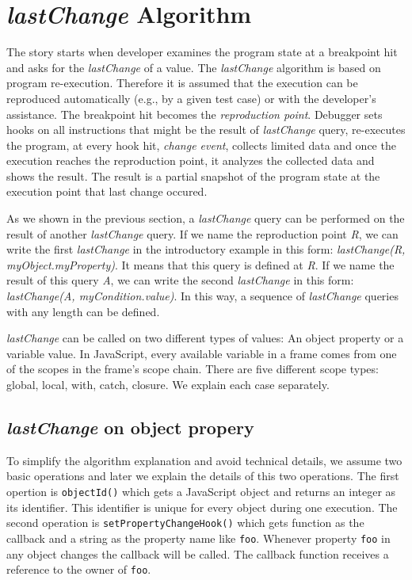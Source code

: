\documentclass[preprint]{sigplanconf}
\begin{document}
\section{\textit{lastChange} Algorithm}

The story starts when developer examines the program state at a breakpoint hit and asks for the \textit{lastChange} of a value. The \textit{lastChange} algorithm is based on program re-execution. Therefore it is assumed that the execution can be reproduced automatically (e.g., by a given test case) or with the developer's assistance. The breakpoint hit becomes the \textit{reproduction point}. Debugger sets hooks on all instructions that might be the result of \textit{lastChange} query, re-executes the program, at every hook hit, \textit{change event}, collects limited data and once the execution reaches the reproduction point, it analyzes the collected data and shows the result. The result is a partial snapshot of the program state at the execution point that last change occured. 

As we shown in the previous section, a \textit{lastChange} query can be performed on the result of another \textit{lastChange} query. If we name the reproduction point \textit{R}, we can write the first \textit{lastChange} in the introductory example in this form: \textit{lastChange(R, myObject.myProperty)}. It means that this query is defined at \textit{R}. If we name the result of this query \textit{A}, we can write the second \textit{lastChange} in this form: \textit{lastChange(A, myCondition.value)}. In this way, a sequence of \textit{lastChange} queries with any length can be defined.

\textit{lastChange} can be called on two different types of values: An object property or a variable value. In JavaScript, every available variable in a frame comes from one of the scopes in the frame's scope chain. There are five different scope types: global, local, with, catch, closure. We explain each case separately.

\subsection{\textit{lastChange} on object propery}
To simplify the algorithm explanation and avoid technical details, we assume two basic operations and later we explain the details of this two operations. The first opertion is \texttt{objectId()} which gets a JavaScript object and returns an integer as its identifier. This identifier is unique for every object during one execution. The second operation is \texttt{setPropertyChangeHook()} which gets function as the callback and a string as the property name like \texttt{foo}. Whenever property \texttt{foo} in any object changes the callback will be called. The callback function receives a reference to the owner of \texttt{foo}.
\end{document}
